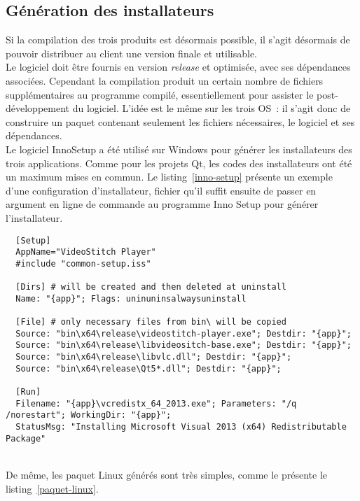 \subsection{Génération des installateurs}
Si la compilation des trois produits est désormais possible, il s'agit désormais
de pouvoir distribuer au client une version finale et utilisable.\\
Le logiciel doit être fournis en version \textit{release} et optimisée, avec ses dépendances associées.
Cependant la compilation produit un certain nombre de fichiers supplémentaires au 
programme compilé, essentiellement pour assister le post-développement du logiciel. 
L'idée est le même sur les trois OS~: il s'agit donc de construire un paquet contenant 
seulement les fichiers nécessaires, le logiciel et ses dépendances.\\
\newline
Le logiciel InnoSetup a été utilisé sur Windows pour générer les installateurs 
des trois applications. Comme pour les projets Qt, les codes des installateurs
ont été un maximum mises en commun. Le listing~\ref{inno-setup} présente un exemple
d'une configuration d'installateur, fichier qu'il suffit ensuite de passer en argument en ligne
de commande au programme Inno Setup pour générer l'installateur.
\begin{listing}
  \begin{verbatim}
  [Setup]
  AppName="VideoStitch Player"
  #include "common-setup.iss"

  [Dirs] # will be created and then deleted at uninstall
  Name: "{app}"; Flags: uninuninsalwaysuninstall

  [File] # only necessary files from bin\ will be copied
  Source: "bin\x64\release\videostitch-player.exe"; Destdir: "{app}";
  Source: "bin\x64\release\libvideositch-base.exe"; Destdir: "{app}";
  Source: "bin\x64\release\libvlc.dll"; Destdir: "{app}";
  Source: "bin\x64\release\Qt5*.dll"; Destdir: "{app}";

  [Run]
  Filename: "{app}\vcredistx_64_2013.exe"; Parameters: "/q /norestart"; WorkingDir: "{app}";
  StatusMsg: "Installing Microsoft Visual 2013 (x64) Redistributable Package"
  \end{verbatim}
  \caption{Extrait de la configuration de l'installateur de VideoStitch Player}
  \label{inno-setup}
\end{listing}
\ \\
De même, les paquet Linux générés sont très simples, comme le présente le listing~\ref{paquet-linux}.
\begin{listing}
  \caption{Paquet Linux de VideoStitch Player}
  \label{paquet-linux}
\end{listing}

